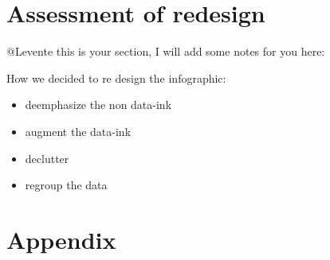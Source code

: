 \documentclass[a4paper, 11pt]{scrartcl}
\begin{document}





\section{Assessment of redesign}

@Levente this is your section, I will add some notes for you here:

How we decided to re design the infographic:

\begin{itemize}
	\item deemphasize the non data-ink
	\item augment the data-ink
	\item declutter
	\item regroup the data
\end{itemize}





\newpage
\clearpage
\section{Appendix}
\end{document}

